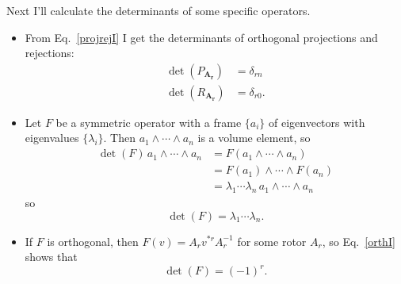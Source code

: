 \documentclass{utarticle}
\newcommand{\bl}[1]{\ensuremath{\bm{#1}}}
\DeclareMathOperator{\out}{\wedge}
\newcommand{\grinv}[2][]{\ensuremath{#2^{*#1}}}
\begin{document}
Next I'll calculate the determinants of some specific operators.  
\begin{itemize}
\item From Eq.~\eqref{projrejI} I get the determinants of orthogonal projections and rejections:
          \begin{align}
          \det(P_{\bl{A_r}}) & = \delta_{rn} \nonumber \\
          \det(R_{\bl{A_r}}) & = \delta_{r0}.
          \end{align}
\item Let $F$ be a symmetric operator with a frame $\{a_i\}$ of eigenvectors with eigenvalues 
         $\{\lambda_i\}$.  Then $a_1 \out \dotsb \out a_n$ is a volume element, so
         \begin{align}
         \det(F) \, a_1 \out \dotsb \out a_n & = F(a_1 \out \dotsb \out a_n) \nonumber \\
                                                                    & = F(a_1) \out \dotsb \out F(a_n) \nonumber \\
                                                                    & = \lambda_1 \dotsb \lambda_n \, a_1 \out \dotsb \out a_n
         \end{align}
         so
         \begin{equation} \det(F) = \lambda_1 \dotsb \lambda_n. \end{equation}
\item If $F$ is orthogonal, then $F(v) = A_r \grinv[r]{v} A_r^{-1}$ for some rotor $A_r$, so 
         Eq.~\eqref{orthI} shows that
         \begin{equation} \det(F) = (-1)^r. \end{equation}
\end{itemize}
\end{document}
